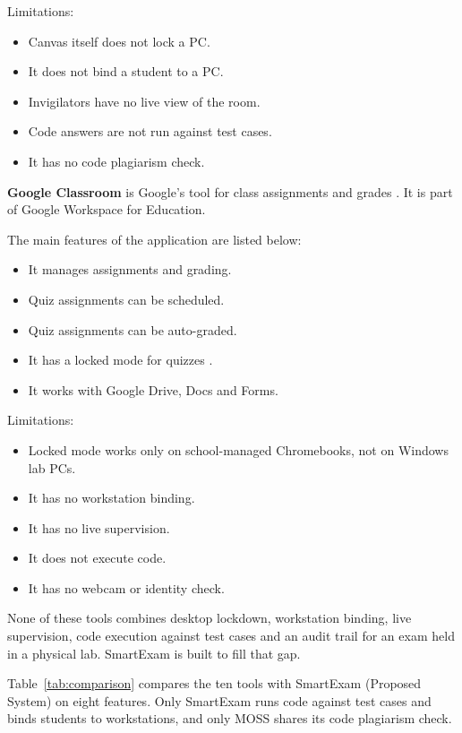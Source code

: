 \noindent Limitations:
\begin{itemize}[noitemsep]
\item Canvas itself does not lock a PC.
\item It does not bind a student to a PC.
\item Invigilators have no live view of the room.
\item Code answers are not run against test cases.
\item It has no code plagiarism check.
\end{itemize}

\noindent\textbf{Google Classroom} is Google's tool for class assignments and grades \cite{gclassroom1}. It is part of Google Workspace for Education.

\noindent The main features of the application are listed below:
\begin{itemize}[noitemsep]
\item It manages assignments and grading.
\item Quiz assignments can be scheduled.
\item Quiz assignments can be auto-graded.
\item It has a locked mode for quizzes \cite{gclassroom_quiz}.
\item It works with Google Drive, Docs and Forms.
\end{itemize}

\noindent Limitations:
\begin{itemize}[noitemsep]
\item Locked mode works only on school-managed Chromebooks, not on Windows lab PCs.
\item It has no workstation binding.
\item It has no live supervision.
\item It does not execute code.
\item It has no webcam or identity check.
\end{itemize}

None of these tools combines desktop lockdown, workstation binding, live supervision, code execution against test cases and an audit trail for an exam held in a physical lab. SmartExam is built to fill that gap.

Table~\ref{tab:comparison} compares the ten tools with SmartExam (Proposed System) on eight features. Only SmartExam runs code against test cases and binds students to workstations, and only MOSS shares its code plagiarism check.


